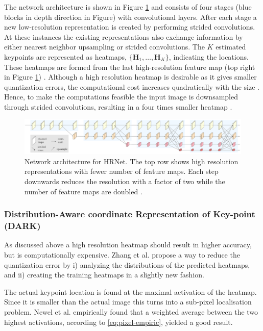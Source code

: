 The network architecture is shown in Figure \ref{fig:hrnet} and consists of four stages (blue blocks in depth direction in Figure) with convolutional layers. After each stage a new low-resolution representation is created by performing strided convolutions. At these instances the existing representations also exchange information by either nearest neighbor upsampling or strided convolutions. The $K$ estimated keypoints are represented as heatmaps, $\{\mathbf{H}_1, \hdots, \mathbf{H}_K\}$, indicating the locations. These heatmaps are formed from the last high-resolution feature map (top right in Figure \ref{fig:hrnet}) \cite{Sun2019}. Although a high resolution heatmap is desirable as it gives smaller quantization errors, the computational cost increases quadratically with the size \cite{Zhang2020}. Hence, to make the computations feasible the input image is downsampled through strided convolutions, resulting in a four times smaller heatmap \cite{Wang2020}.  %

\begin{figure}
 \centering
 \includegraphics[width=\textwidth]{files/figs/hrnet.png}
 \caption{Network architecture for HRNet. The top row shows high resolution representations with fewer number of feature maps. Each step downwards reduces the resolution with a factor of two while the number of feature maps are doubled \cite{Wang2020}.}
 \label{fig:hrnet}
\end{figure}

\subsubsection{Distribution-Aware coordinate Representation of Key-point (DARK)} \label{sec:dark}
As discussed above a high resolution heatmap should result in higher accuracy, but is computationally expensive. Zhang et al. \cite{Zhang2020} propose a way to reduce the quantization error by i) analyzing the distributions of the predicted heatmaps, and ii) creating the training heatmaps in a slightly new fashion.

The actual keypoint location is found at the maximal activation of the heatmap. Since it is smaller than the actual image this turns into a sub-pixel localisation problem. Newel et al. \cite{Newell2016} empirically found that a weighted average between the two highest activations, according to \eqref{eq:pixel-empiric}, yielded a good result.

